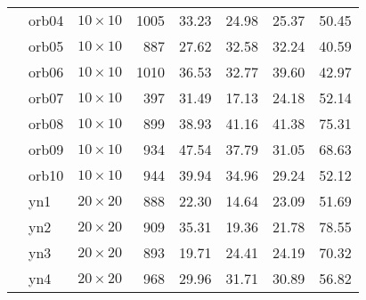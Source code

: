 \begin{longtable}{|ll|c|r|rrrr|}
& orb04&$10\times10$& 1005 & 33.23 & 24.98 & 25.37 & 50.45\\
& orb05&$10\times10$& 887 & 27.62 & 32.58 & 32.24 & 40.59\\
& orb06&$10\times10$& 1010 & 36.53 & 32.77 & 39.60 & 42.97\\
& orb07&$10\times10$& 397 & 31.49 & 17.13 & 24.18 & 52.14\\
& orb08&$10\times10$& 899 & 38.93 & 41.16 & 41.38 & 75.31\\
& orb09&$10\times10$& 934 & 47.54 & 37.79 & 31.05 & 68.63\\
& orb10&$10\times10$& 944 & 39.94 & 34.96 & 29.24 & 52.12\\
\hline\pagebreak[2]
\multirow{4}{*}{$\mathcal{P}_{yn}$}
& yn1&$20\times20$& 888 & 22.30 & 14.64 & 23.09 & 51.69\\
& yn2&$20\times20$& 909 & 35.31 & 19.36 & 21.78 & 78.55\\
& yn3&$20\times20$& 893 & 19.71 & 24.41 & 24.19 & 70.32\\
& yn4&$20\times20$& 968 & 29.96 & 31.71 & 30.89 & 56.82\\
\end{longtable}
\renewcommand{\arraystretch}{1}
